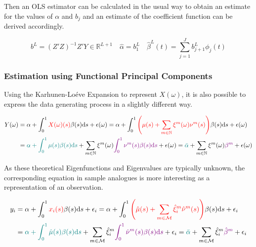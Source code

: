 \documentclass[11pt,twoside,a4paper]{article}
\begin{document}
	Then an OLS estimator can be calculated in the usual way to obtain an estimate for the values of $\alpha$ and $b_j$ and an estimate of the coefficient function can be derived accordingly.
	
	\begin{equation}
		b^L = \left(Z'Z\right)^{-1}Z'Y \in \mathbb{R}^{L+1} \quad \hat{\alpha} = b_{1}^{L} \quad \hat{\beta}^L(t) = \sum_{j = 1}^{J} b_{j+1}^L \phi_j(t)
	\end{equation}
	
	\subsubsection{Estimation using Functional Principal Components}
	
	Using the Karhunen-Lo\'{e}ve Expansion to represent $X(\omega)$, it is also possible to express the data generating process in a slightly different way.
	
	\begin{equation}
		\begin{split}
			Y(\omega) &= \alpha + \int_{0}^{1} {\color{red}X(\omega)(s)} \beta(s) \mathrm{d}s + \epsilon(\omega)
			= \alpha + \int_{0}^{1} {\color{red}\left(\mu(s) + \sum_{m \in \mathbb{N}} \xi^m(\omega) \nu^m(s)\right)} \beta(s) \mathrm{d}s + \epsilon(\omega)\\
			&= {\color{teal}\alpha + \int_{0}^{1} \mu(s) \beta(s) \mathrm{d}s} + \sum_{m \in \mathbb{N}} \xi^m(\omega) {\color{violet}\int_{0}^{1} \nu^m(s) \beta(s) \mathrm{d}s} + \epsilon(\omega)
			= {\color{teal}\bar{\alpha}} + \sum_{m \in \mathbb{N}} \xi^m(\omega) {\color{violet}\beta^m} + \epsilon(\omega)
		\end{split}
	\end{equation}

	As these theoretical Eigenfunctions and Eigenvalues are typically unknown, the corresponding equation in sample analogues is more interesting as a representation of an observation.
	
	\begin{equation}
		\begin{split}
			y_i &= \alpha + \int_{0}^{1} {\color{red}x_i(s)} \beta(s) \mathrm{d}s + \epsilon_i
			= \alpha + \int_{0}^{1} {\color{red}\left(\hat{\mu}(s) + \sum_{m \in \mathcal{M}} \hat{\xi}^m_i \hat{\nu}^m(s)\right)} \beta(s) \mathrm{d}s + \epsilon_i\\
			&= {\color{teal}\alpha + \int_{0}^{1} \hat{\mu}(s) \beta(s) \mathrm{d}s} + \sum_{m \in \mathcal{M}} \hat{\xi}^m_i {\color{violet}\int_{0}^{1} \hat{\nu}^m(s) \beta(s) \mathrm{d}s} + \epsilon_i
			= {\color{teal}\bar{\alpha}} + \sum_{m \in \mathcal{M}} \hat{\xi}^m_i {\color{violet}\hat{\beta}^m} + \epsilon_i
		\end{split}
	\end{equation}
	
\end{document}
